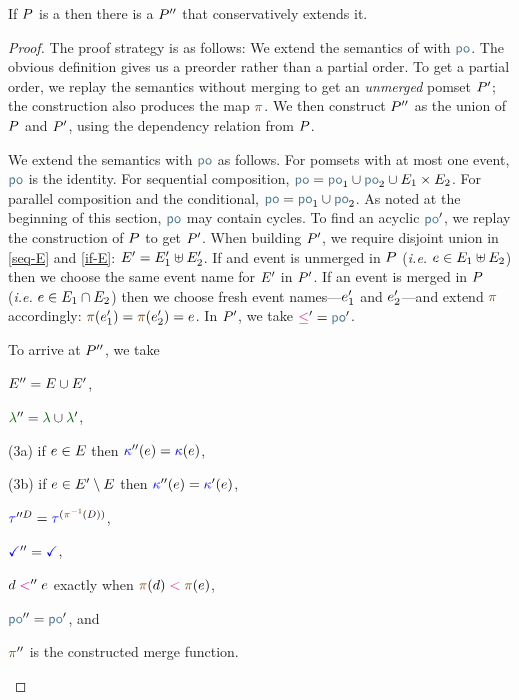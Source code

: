 \begin{lemma}
  \label{lem:po}
  If $P$ is a \PwT{} then there is a \PwTpo{} $P''$ that conservatively
  extends it.
  \begin{proof}
    The proof strategy is as follows: We extend the semantics of
     with $\rpox$.  The obvious definition gives us a
    preorder rather than a partial order.  To get a partial order, we replay
    the semantics without merging to get an \emph{unmerged} pomset $P'$;
    the construction also produces the map $\fmrg{}$.  We then construct
    $P''$ as the union of $P$ and $P'$, using the dependency
    relation from $P$.

    We extend the semantics with $\rpox$ as follows.  For pomsets with at
    most one event, ${\rpox}$ is the identity.  For sequential composition,
    ${\rpox}={\rpox_1}\cup {\rpox_2}\cup{\aEvs_1\times\aEvs_2}$.  For
    parallel composition and the conditional,
    ${\rpox}={\rpox_1}\cup {\rpox_2}$.  As noted at the beginning of this
    section, $\rpox$ may contain cycles. 
    To find an acyclic $\rpox'$, we replay the construction of $P$ to get
    $P'$.  When building $P'$, we require disjoint union in \ref{seq-E}
    and \ref{if-E}: $E' = E'_1\uplus E'_2$.  If and event is
    unmerged in $P$ (\emph{i.e.} $e\in E_1\uplus E_2$) then we choose the
    same event name for $E'$ in $P'$.  If an event is merged in
    $P$ (\emph{i.e.} $e\in E_1\cap E_2$) then we choose fresh event
    names---$e'_1$ and $e'_2$---and extend $\fmrg{}$
    accordingly: $\fmrg{\aEv'_1}=\fmrg{\aEv'_2}=\aEv$.  In $P'$, we take
    ${\le'}={\rpox'}$.

    To arrive at $P''$, we take
    \begin{enumerate*}
    \item
      $E''=E\cup E'$,
    \item
      $\labeling''=\labeling\cup\labeling'$,
    \item[(3a)]
      if $e\in E$ then ${\color{blue}\kappa}''(e)={\color{blue}\kappa}(e)$,
    \item[(3b)]
      if $e\in E'\setminus E$ then ${\color{blue}\kappa}''(e)={\color{blue}\kappa}'(e)$,
    \item
      $\aTr{\prime\prime\bEvs}{}=\aTr{(\fmrginv{\bEvs})}{}$,
    \item
      $\aTerm''=\aTerm$,
    \item \label{le-item}
      ${d}\mathrel{{\color{magenta}<}}'' {e}$ exactly when $\fmrg{\bEv}\lt\fmrg{\aEv}$,
    \item \label{pox-item}
      ${\rpox''}={\rpox'}$, and
    \item 
      $\fmrg{}''$ is the constructed merge function. %
    \end{enumerate*}
  \end{proof}
\end{lemma}
